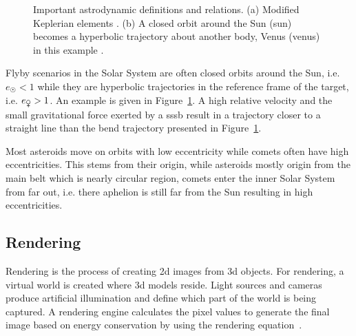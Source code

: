 \begin{figure}[htb]
\begin{subfigure}[b]{0.47\textwidth}
        \caption{}
        \label{fig:hyperbolic_orbit}
    \end{subfigure}
    \label{fig:astrodynamics}
    \caption{Important astrodynamic definitions and relations. (a) Modified Keplerian elements \cite{Commons2019Orbit}. (b) A closed orbit around the Sun (\gls{sun}) becomes a hyperbolic trajectory about another body, Venus (\gls{venus}) in this example \cite{Hintz2015FundamentalsAstrodynamics}.}
\end{figure}

Flyby scenarios in the Solar System are often closed orbits around the Sun, i.e. $e_{\astrosun} < 1$ while they are hyperbolic trajectories in the reference frame of the target, i.e. $e_{\venus} > 1$. An example is given in Figure~\ref{fig:hyperbolic_orbit}. A high relative velocity and the small gravitational force exerted by a \gls{sssb} result in a trajectory closer to a straight line than the bend trajectory presented in Figure~\ref{fig:hyperbolic_orbit}. 

Most asteroids move on orbits with low eccentricity while comets often have high eccentricities. This stems from their origin, while asteroids mostly origin from the main belt which is nearly circular region, comets enter the inner Solar System from far out, i.e. there aphelion is still far from the Sun resulting in high eccentricities.

\subsection{Rendering}
Rendering is the process of creating \gls{2d} images from \gls{3d} objects. For rendering, a virtual world is created where \gls{3d} models reside. Light sources and cameras produce artificial illumination and define which part of the world is being captured. A rendering engine calculates the pixel values to generate the final image based on energy conservation by using the rendering equation~\cite{Kajiya1986TheEquation}.

